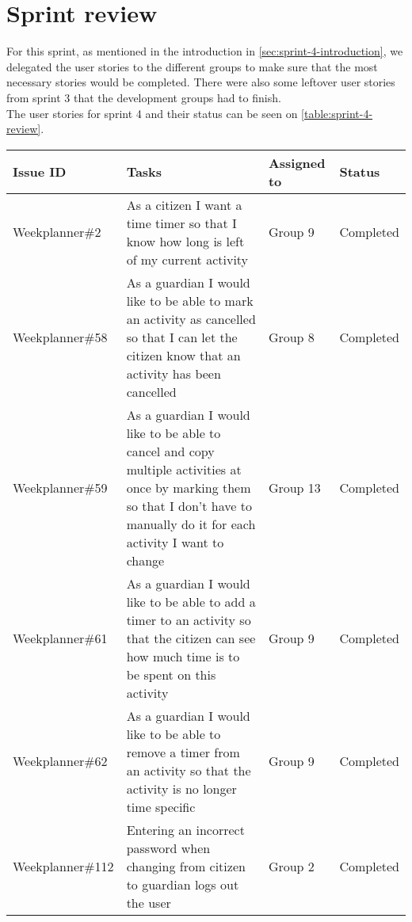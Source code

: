 \section{Sprint review}
For this sprint, as mentioned in the introduction in \autoref{sec:sprint-4-introduction}, we delegated the user stories to the different groups to make sure that the most necessary stories would be completed. There were also some leftover user stories from sprint 3 that the development groups had to finish.
\\
The user stories for sprint 4 and their status can be seen on \autoref{table:sprint-4-review}.
\begin{longtable}{|p{2.9cm}|p{8cm}|p{2cm}|p{2cm}|}
    \hline
    Issue ID        & Tasks                                                                                                                                                                                    & Assigned to  & Status   \\ \hline
    Weekplanner\#2 & As a citizen I want a time timer so that I know how long is left of my current activity                                                                                                   & Group 9      & Completed  \\ \hline
    Weekplanner\#58 & As a guardian I would like to be able to mark an activity as cancelled so that I can let the citizen know that an activity has been cancelled                                            & Group 8      & Completed   \\ \hline
    Weekplanner\#59 & As a guardian I would like to be able to cancel and copy multiple activities at once by marking them so that I don't have to manually do it for each activity I want to change           & Group 13     & Completed   \\ \hline
    Weekplanner\#61 & As a guardian I would like to be able to add a timer to an activity so that the citizen can see how much time is to be spent on this activity                                            & Group 9      & Completed    \\ \hline
    Weekplanner\#62 & As a guardian I would like to be able to remove a timer from an activity so that the activity is no longer time specific                                                                 & Group 9      & Completed    \\ \hline
    Weekplanner\#112 & Entering an incorrect password when changing from citizen to guardian logs out the user                                                                                                 & Group 2      & Completed    \\ \hline

\end{longtable}
